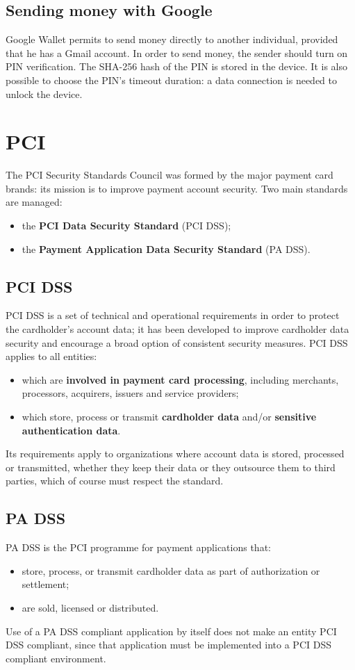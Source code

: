 \documentclass[a4paper, 10pt, titlepage]{article}
\begin{document}
\subsection{Sending money with Google}
Google Wallet permits to send money directly to another individual, provided that he has a Gmail account. In order to send money, the sender should turn on PIN verification. The SHA-256 hash of the PIN is stored in the device. It is also possible to choose the PIN's timeout duration: a data connection is needed to unlock the device.

\section{PCI}
The PCI Security Standards Council was formed by the major payment card brands: its mission is to improve payment account security. Two main standards are managed:
\begin{itemize}
\item the \textbf{PCI Data Security Standard} (PCI DSS);
\item the \textbf{Payment Application Data Security Standard} (PA DSS).
\end{itemize}

\subsection{PCI DSS}
\label{section:pci}
PCI DSS is a set of technical and operational requirements in order to protect the cardholder's account data; it has been developed to improve cardholder data security and encourage a broad option of consistent security measures. PCI DSS applies to all entities:
\begin{itemize}
\item which are \textbf{involved in payment card processing}, including merchants, processors, acquirers, issuers and service providers;
\item which store, process or transmit \textbf{cardholder data} and/or \textbf{sensitive authentication data}.
\end{itemize}
Its requirements apply to organizations where account data is stored, processed or transmitted, whether they keep their data or they outsource them to third parties, which of course must respect the standard.

\subsection{PA DSS}
PA DSS is the PCI programme for payment applications that:
\begin{itemize}
\item store, process, or transmit cardholder data as part of authorization or settlement;
\item are sold, licensed or distributed.
\end{itemize} 
Use of a PA DSS compliant application by itself does not make an entity PCI DSS compliant, since that application must be implemented into a PCI DSS compliant environment.
\end{document}
